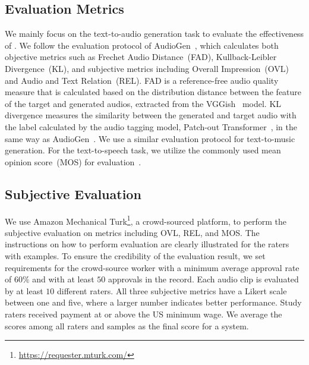 \documentclass[lettersize,journal]{IEEEtran}
\begin{document}
\subsection{Evaluation Metrics} 
\noindent
We mainly focus on the text-to-audio generation task to evaluate the effectiveness of \vModelName. We follow the evaluation protocol of AudioGen~\cite{kreuk2022audiogen}, which calculates both objective metrics such as Frechet Audio Distance~(FAD), Kullback-Leibler Divergence~(KL), and subjective metrics including Overall Impression~(OVL) and Audio and Text Relation~(REL). FAD is a reference-free audio quality measure that is calculated based on the distribution distance between the feature of the target and generated audios, extracted from the VGGish~\cite{vggish_hershey2017cnn} model. KL divergence measures the similarity between the generated and target audio with the label calculated by the audio tagging model, Patch-out Transformer~\cite{koutini2021efficient}, in the same way as AudioGen~\cite{kreuk2022audiogen}. We use a similar evaluation protocol for text-to-music generation. For the text-to-speech task, we utilize the commonly used mean opinion score~(MOS) for evaluation~\cite{tan2023neural}. 


\subsection{Subjective Evaluation} 
\noindent
We use Amazon Mechanical Turk\footnote{\url{https://requester.mturk.com/}}, a crowd-sourced platform, to perform the subjective evaluation on metrics including OVL, REL, and MOS. The instructions on how to perform evaluation are clearly illustrated for the raters with examples. To ensure the credibility of the evaluation result, we set requirements for the crowd-source worker with a minimum average approval rate of $60\%$ and with at least $50$ approvals in the record. Each audio clip is evaluated by at least $10$ different raters. All three subjective metrics have a Likert scale~\cite{likert1932technique} between one and five, where a larger number indicates better performance. Study raters received payment at or above the US minimum wage. We average the scores among all raters and samples as the final score for a system. 
\end{document}

